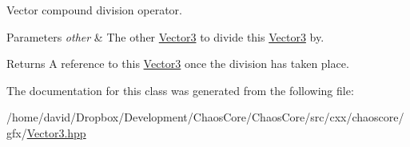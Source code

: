 Vector compound division operator. 


\begin{DoxyParams}{Parameters}
{\em other} & The other \hyperlink{classchaos_1_1gfx_1_1_vector3}{Vector3} to divide this \hyperlink{classchaos_1_1gfx_1_1_vector3}{Vector3} by. \\
\hline
\end{DoxyParams}
\begin{DoxyReturn}{Returns}
A reference to this \hyperlink{classchaos_1_1gfx_1_1_vector3}{Vector3} once the division has taken place. 
\end{DoxyReturn}


The documentation for this class was generated from the following file\-:\begin{DoxyCompactItemize}
\item 
/home/david/\-Dropbox/\-Development/\-Chaos\-Core/\-Chaos\-Core/src/cxx/chaoscore/gfx/\hyperlink{_vector3_8hpp}{Vector3.\-hpp}\end{DoxyCompactItemize}
